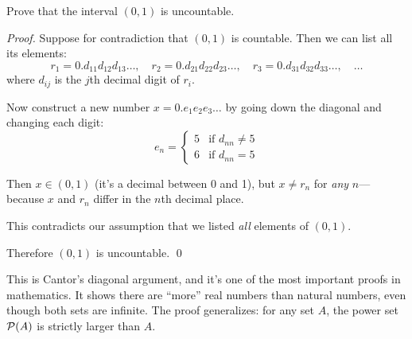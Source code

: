 \begin{example}
Prove that the interval $(0, 1)$ is uncountable.

\emph{Proof.} Suppose for contradiction that $(0, 1)$ is countable. Then we can list all its elements:
\[
r_1 = 0.d_{11}d_{12}d_{13}\ldots, \quad r_2 = 0.d_{21}d_{22}d_{23}\ldots, \quad r_3 = 0.d_{31}d_{32}d_{33}\ldots, \quad \ldots
\]
where $d_{ij}$ is the $j$th decimal digit of $r_i$.

Now construct a new number $x = 0.e_1e_2e_3\ldots$ by going down the diagonal and changing each digit:
\[
e_n = \begin{cases} 5 & \text{if } d_{nn} \neq 5 \\ 6 & \text{if } d_{nn} = 5 \end{cases}
\]

Then $x \in (0, 1)$ (it's a decimal between 0 and 1), but $x \neq r_n$ for \emph{any} $n$---because $x$ and $r_n$ differ in the $n$th decimal place.

This contradicts our assumption that we listed \emph{all} elements of $(0, 1)$.

Therefore $(0, 1)$ is uncountable. \qed

This is Cantor's diagonal argument, and it's one of the most important proofs in mathematics. It shows there are ``more'' real numbers than natural numbers, even though both sets are infinite. The proof generalizes: for any set $A$, the power set $\mathcal{P}(A)$ is strictly larger than $A$.
\end{example}

